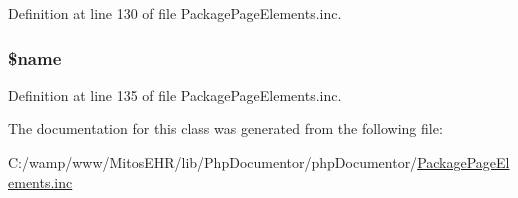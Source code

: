 \-Definition at line 130 of file \-Package\-Page\-Elements.\-inc.

\hypertarget{classparser_x_m_l_doc_book_tag_ab2fc40d43824ea3e1ce5d86dee0d763b}{
\subsubsection[{\$name}]{\setlength{\rightskip}{0pt plus 5cm}\$name}}\label{classparser_x_m_l_doc_book_tag_ab2fc40d43824ea3e1ce5d86dee0d763b}


\-Definition at line 135 of file \-Package\-Page\-Elements.\-inc.



\-The documentation for this class was generated from the following file\-:\begin{DoxyCompactItemize}
\item 
\-C\-:/wamp/www/\-Mitos\-E\-H\-R/lib/\-Php\-Documentor/php\-Documentor/\hyperlink{_package_page_elements_8inc}{\-Package\-Page\-Elements.\-inc}\end{DoxyCompactItemize}
